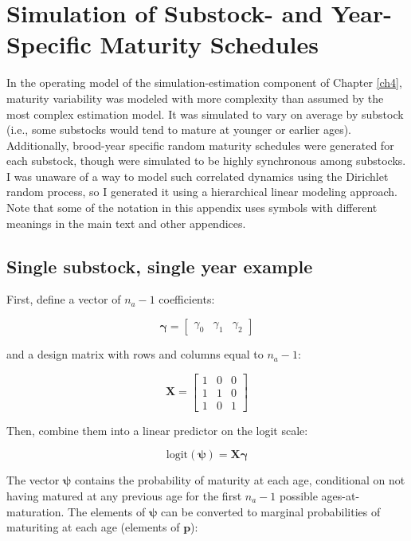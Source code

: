 \documentclass[12pt,]{book}
\theoremstyle{definition}
\theoremstyle{definition}
\theoremstyle{definition}
\theoremstyle{remark}
\begin{document}
\chapter{Simulation of Substock- and Year-Specific Maturity
Schedules}\label{appendix-d}

\doublespacing

\noindent
In the operating model of the simulation-estimation component of Chapter
\ref{ch4}, maturity variability was modeled with more complexity than
assumed by the most complex estimation model. It was simulated to vary
on average by substock (i.e., some substocks would tend to mature at
younger or earlier ages). Additionally, brood-year specific random
maturity schedules were generated for each substock, though were
simulated to be highly synchronous among substocks. I was unaware of a
way to model such correlated dynamics using the Dirichlet random
process, so I generated it using a hierarchical linear modeling
approach. Note that some of the notation in this appendix uses symbols
with different meanings in the main text and other appendices.

\section{Single substock, single year
example}\label{single-substock-single-year-example}

\noindent
First, define a vector of \(n_a - 1\) coefficients:

\[
\boldsymbol{\gamma}=
  \begin{bmatrix}
    \gamma_{0} & \gamma_1 & \gamma_2
  \end{bmatrix}
\]

\noindent
and a design matrix with rows and columns equal to \(n_a - 1\):

\[
\mathbf{X}=
  \begin{bmatrix}
    1 & 0 & 0 \\
    1 & 1 & 0 \\
    1 & 0 & 1
  \end{bmatrix}
\]

\noindent
Then, combine them into a linear predictor on the logit scale:

\[\text{logit}(\boldsymbol{\psi}) = \mathbf{X}\boldsymbol{\gamma}\]

\noindent
The vector \(\boldsymbol{\psi}\) contains the probability of maturity at
each age, conditional on not having matured at any previous age for the
first \(n_a - 1\) possible ages-at-maturation. The elements of
\(\boldsymbol{\psi}\) can be converted to marginal probabilities of
maturiting at each age (elements of \(\boldsymbol{p}\)):
\end{document}
